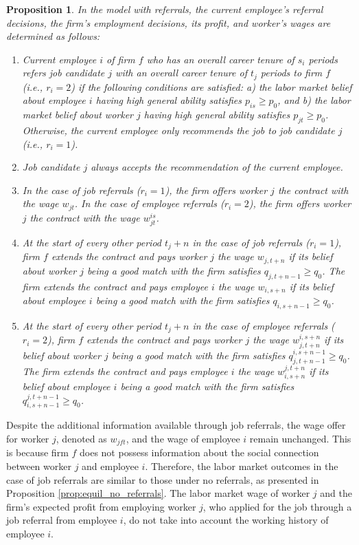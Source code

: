\documentclass[12pt]{article}
\newtheorem{proposition}{Proposition}
\begin{document}
\begin{proposition}\label{prop:equil_referrals}
In the model with referrals, the current employee's referral decisions, the firm's employment decisions, its profit, and worker's wages are determined as follows:
\begin{enumerate}[label={\roman*})]
\item Current employee $i$ of firm $f$ who has an overall career tenure of $s_i$ periods refers job candidate $j$ with an overall career tenure of $t_j$ periods to firm $f$ (i.e., $r_i = 2$) if the following conditions are satisfied: a) the labor market belief about employee $i$ having high general ability satisfies $p_{is} \geq p_0$, and b) the labor market belief about worker $j$ having high general ability satisfies $p_{jt} \geq p_0$. Otherwise, the current employee only recommends the job to job candidate $j$ (i.e., $r_i = 1$).
\item Job candidate $j$ always accepts the recommendation of the current employee.
\item In the case of job referrals ($r_i = 1$), the firm offers worker $j$ the contract with the wage $w_{jt}$. In the case of employee referrals ($r_i = 2$), the firm offers worker $j$ the contract with the wage $w_{jt}^{is}$.
\item At the start of every other period $t_j + n$ in the case of job referrals ($r_i = 1$), firm $f$ extends the contract and pays worker $j$ the wage $w_{j,t+n}$ if its belief about worker $j$ being a good match with the firm satisfies $q_{j,t+n-1} \geq q_0$. The firm extends the contract and pays employee $i$ the wage $w_{i,s+n}$ if its belief about employee $i$ being a good match with the firm satisfies $q_{i,s+n-1} \geq q_0$.
\item At the start of every other period $t_j + n$ in the case of employee referrals ($r_i = 2$), firm $f$ extends the contract and pays worker $j$ the wage $w_{j,t+n}^{i,s+n}$ if its belief about worker $j$ being a good match with the firm satisfies $q_{j,t+n-1}^{i,s+n-1} \geq q_0$. The firm extends the contract and pays employee $i$ the wage $w_{i,s+n}^{j,t+n}$ if its belief about employee $i$ being a good match with the firm satisfies $q_{i,s+n-1}^{j,t+n-1} \geq q_0$.
\end{enumerate}
\end{proposition}


Despite the additional information available through job referrals, the wage offer for worker $j$, denoted as $w_{jft}$, and the wage of employee $i$ remain unchanged. This is because firm $f$ does not possess information about the social connection between worker $j$ and employee $i$. Therefore, the labor market outcomes in the case of job referrals are similar to those under no referrals, as presented in Proposition \ref{prop:equil_no_referrals}. The labor market wage of worker $j$ and the firm's expected profit from employing worker $j$, who applied for the job through a job referral from employee $i$, do not take into account the working history of employee $i$.
\end{document}
